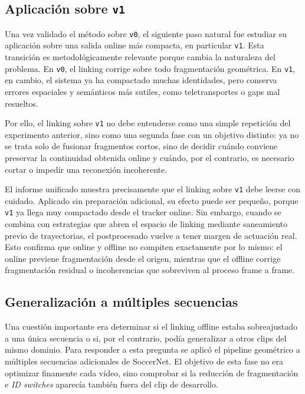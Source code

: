 \documentclass[../MAIN.tex]{subfiles}
\begin{document}
	\subsection{Aplicación sobre \texttt{v1}}
	
	Una vez validado el método sobre \texttt{v0}, el siguiente paso natural fue estudiar su aplicación sobre una salida online más compacta, en particular \texttt{v1}. Esta transición es metodológicamente relevante porque cambia la naturaleza del problema. En \texttt{v0}, el linking corrige sobre todo fragmentación geométrica. En \texttt{v1}, en cambio, el sistema ya ha compactado muchas identidades, pero conserva errores espaciales y semánticos más sutiles, como teletransportes o gaps mal resueltos.
	
	Por ello, el linking sobre \texttt{v1} no debe entenderse como una simple repetición del experimento anterior, sino como una segunda fase con un objetivo distinto: ya no se trata solo de fusionar fragmentos cortos, sino de decidir cuándo conviene preservar la continuidad obtenida online y cuándo, por el contrario, es necesario cortar o impedir una reconexión incoherente.
	
	El informe unificado muestra precisamente que el linking sobre \texttt{v1} debe leerse con cuidado. Aplicado sin preparación adicional, su efecto puede ser pequeño, porque \texttt{v1} ya llega muy compactado desde el tracker online. Sin embargo, cuando se combina con estrategias que abren el espacio de linking mediante saneamiento previo de trayectorias, el postprocesado vuelve a tener margen de actuación real. Esto confirma que online y offline no compiten exactamente por lo mismo: el online previene fragmentación desde el origen, mientras que el offline corrige fragmentación residual o incoherencias que sobreviven al proceso frame a frame.
	
	\subsection{Generalización a múltiples secuencias}
	
	Una cuestión importante era determinar si el linking offline estaba sobreajustado a una única secuencia o si, por el contrario, podía generalizar a otros clips del mismo dominio. Para responder a esta pregunta se aplicó el pipeline geométrico a múltiples secuencias adicionales de SoccerNet. El objetivo de esta fase no era optimizar finamente cada vídeo, sino comprobar si la reducción de fragmentación e \textit{ID switches} aparecía también fuera del clip de desarrollo.
	
\end{document}
